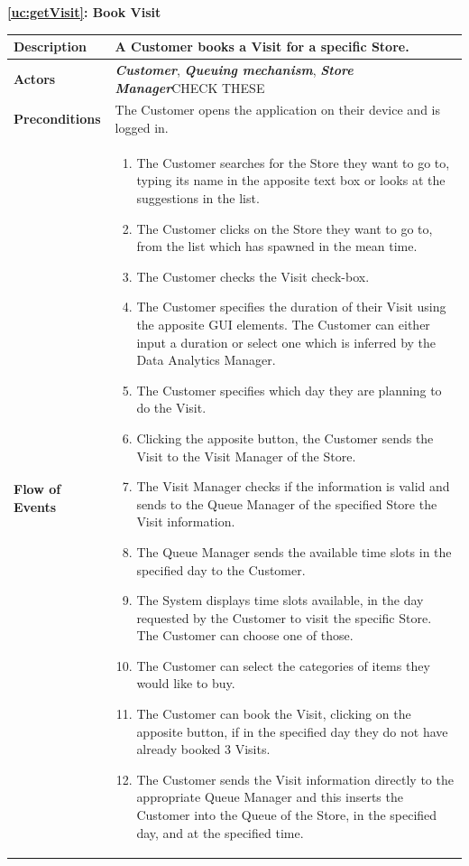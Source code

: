 \documentclass[a4paper, 10pt, oneside]{article}
\newcommand*{\lorenzo}[1]{\textcolor{BurntOrange}{#1}}
\begin{document}
\begin{center}
{\textbf{\ref{uc:getVisit}: Book Visit}}
\end{center}
\begin{tabularx}{\linewidth}{| l | X |}
	
	\hline
	\textbf{Description} & A Customer books a Visit for a specific Store.\\
	

	\hline
	\textbf{Actors} & \textbf{\textit{Customer}}, \textit{\textbf{Queuing mechanism}}, \textbf{\textit{Store Manager}}\lorenzo{CHECK THESE}\\
	
	\hline
	\textbf{Preconditions} & The Customer opens the application on their device and is logged in.\\
	
	\hline
	\textbf{Flow of Events} & \parbox{0.7\textwidth}{	
		\begin{enumerate}
			\item The Customer searches for the Store they want to go to, typing its name in the apposite text box or looks at the suggestions in the list.
			\item The Customer clicks on the Store they want to go to, from the list which has spawned in the mean time.
			\item The Customer checks the Visit check-box.
			\item The Customer specifies the duration of their Visit using the apposite GUI elements. The Customer can either input a duration or select one which is inferred by the Data Analytics Manager.
			\item The Customer specifies which day they are planning to do the Visit.
			\item Clicking the apposite button, the Customer sends the Visit to the Visit Manager of the Store.
			\item The Visit Manager checks if the information is valid and sends to the Queue Manager of the specified Store the Visit information.
			\item The Queue Manager sends the available time slots in the specified day to the Customer.
			\item The System displays time slots available, in the day requested by the Customer to visit the specific Store. The Customer can choose one of those.
			\item The Customer can select the categories of items they would like to buy.
			\item The Customer can book the Visit, clicking on the apposite button, if in the specified day they do not have already booked 3 Visits.
			\item The Customer sends the Visit information directly to the appropriate Queue Manager and this inserts the Customer into the Queue of the Store, in the specified day, and at the specified time.
	\end{enumerate}}\\
	

\end{tabularx}
\end{document}
